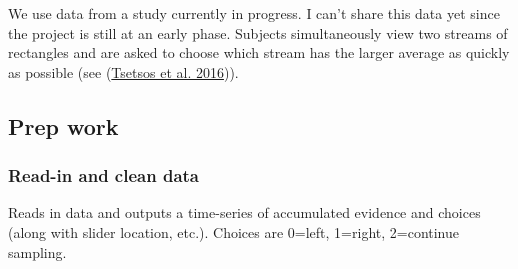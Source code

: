 \documentclass[
]{book}
\begin{document}
We use data from a study currently in progress. I can't share this data yet since the project is still at an early phase. Subjects simultaneously view two streams of rectangles and are asked to choose which stream has the larger average as quickly as possible (see (\protect\hyperlink{ref-tsetsos2016}{Tsetsos et al. 2016})).

\hypertarget{prep-work}{%
\subsection{Prep work}\label{prep-work}}

\hypertarget{read-in-and-clean-data}{%
\subsubsection*{Read-in and clean data}\label{read-in-and-clean-data}}

Reads in data and outputs a time-series of accumulated evidence and choices (along with slider location, etc.). Choices are 0=left, 1=right, 2=continue sampling.
\end{document}
